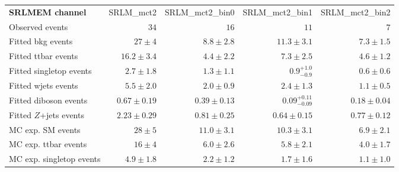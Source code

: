 

\begin{table}
\begin{center}
\setlength{\tabcolsep}{0.0pc}
{\small
\begin{tabular*}{\textwidth}{@{\extracolsep{\fill}}lrrrr}
\noalign{\smallskip}\hline\noalign{\smallskip}
{\textbf{ SRLMEM channel}}           & SRLM\_mct2            & SRLM\_mct2\_bin0            & SRLM\_mct2\_bin1            & SRLM\_mct2\_bin2              \\[-0.05cm]
\noalign{\smallskip}\hline\noalign{\smallskip}
Observed events          & $34$              & $16$              & $11$              & $7$                    \\
\noalign{\smallskip}\hline\noalign{\smallskip}
Fitted bkg events         & $27 \pm 4$          & $8.8 \pm 2.8$          & $11.3 \pm 3.1$          & $7.3 \pm 1.5$              \\
\noalign{\smallskip}\hline\noalign{\smallskip}
        Fitted ttbar events         & $16.2 \pm 3.4$          & $4.4 \pm 2.2$          & $7.3 \pm 2.5$          & $4.6 \pm 1.2$              \\
        Fitted singletop events         & $2.7 \pm 1.8$          & $1.3 \pm 1.1$          & $0.9_{-0.9}^{+1.0}$          & $0.6 \pm 0.6$              \\
        Fitted wjets events         & $5.5 \pm 2.0$          & $2.0 \pm 0.9$          & $2.4 \pm 1.3$          & $1.1 \pm 0.5$              \\
        Fitted diboson events         & $0.67 \pm 0.19$          & $0.39 \pm 0.13$          & $0.09_{-0.09}^{+0.11}$          & $0.18 \pm 0.04$              \\
        Fitted $Z$+jets events         & $2.23 \pm 0.29$          & $0.81 \pm 0.25$          & $0.64 \pm 0.15$          & $0.77 \pm 0.12$              \\
 \noalign{\smallskip}\hline\noalign{\smallskip}
MC exp. SM events              & $28 \pm 5$          & $11.0 \pm 3.1$          & $10.3 \pm 3.1$          & $6.9 \pm 2.1$              \\
\noalign{\smallskip}\hline\noalign{\smallskip}
        MC exp. ttbar events         & $16 \pm 4$          & $6.0 \pm 2.6$          & $5.8 \pm 2.1$          & $4.0 \pm 1.7$              \\
        MC exp. singletop events         & $4.9 \pm 1.8$          & $2.2 \pm 1.2$          & $1.7 \pm 1.6$          & $1.1 \pm 1.0$              \\

\end{tabular*}}
\end{center}
\end{table}
